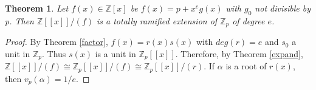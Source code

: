 \documentclass{article}
\newtheorem{theorem}{Theorem}
\begin{document}
\begin{theorem}
Let $f(x) \in \mathbb{Z}[x]$ be $f(x) = p + x^e g(x)$ with $g_0$ not divisible by p.  Then $\mathbb{Z}[[x]]/(f)$ is a totally ramified extension of $\mathbb{Z}_p$ of degree $e$.
\end{theorem}

\begin{proof}
By Theorem \ref{factor}, $f(x) = r(x)s(x)$ with $deg(r) = e$ and $s_0$ a unit in $\mathbb{Z}_p$.  Thus $s(x)$ is a unit in $\mathbb{Z}_p[[x]]$.  Therefore, by Theorem \ref{expand}, $\mathbb{Z}[[x]]/(f) \cong \mathbb{Z}_p[[x]]/(f) \cong \mathbb{Z}_p[[x]]/(r)$.  If $\alpha$ is a root of $r(x)$, then $v_p(\alpha) = 1/e$.
\end{proof}



\end{document}
